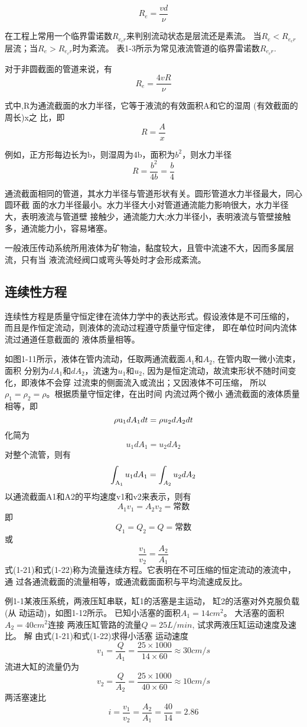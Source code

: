 
$$ R_{e}=\frac{vd}{\nu } $$

在工程上常用一个临界雷诺数$R_{e_cr}$来判别流动状态是层流还是素流。
当$R_{e}<R_{e_cr}$ 层流；当$R_{e} > R_{e_cr}$时为紊流。
表1-3所示为常见液流管道的临界雷诺数$R_{e_cr}$.


对于非圆截面的管道来说，有
$$R_{e}=\frac{4vR}{\nu }$$

式中,R为通流截面的水力半径，它等于液流的有效面积A和它的湿周
(有效截面的周长)x之
比，即
$$R=\frac{A}{x}$$

例如，正方形每边长为b，则湿周为4b，面积为$b^2$，则水力半径
$$R=\frac{b^2}{4b}=\frac{b}{4}$$

通流截面相同的管道，其水力半径与管道形状有关。圆形管道水力半径最大，同心圆环截 面的水力半径最小。水力半径大小对管道通流能力影响很大，水力半径大，表明液流与管道壁 接触少，通流能力大;水力半径小，表明液流与管壁接触多，通流能力小，容易堵塞。

一般液压传动系统所用液体为矿物油，黏度较大，且管中流速不大，因而多属层流，只有当 液流流经阀口或弯头等处时才会形成紊流。

\subsection{连续性方程}

连续性方程是质量守恒定律在流体力学中的表达形式。假设液体是不可压缩的，
而且是作恒定流动，则液体的流动过程遵守质量守恒定律，
即在单位时间内流体流过通道任意截面的 液体质量相等。

如图1-11所示，液体在管内流动，任取两通流截面$A_1$和$A_2$,
在管内取一微小流束，面积 分别为$dA_1$和$dA_2$，流速为$u_1$和$u_2$,
因为是恒定流动，故流束形状不随时间变化，即液体不会穿 
过流束的侧面流入或流出；又因液体不可压缩，
所以$\rho_1=\rho_2=\rho$。根据质量守恒定律，在出时间 内流过两个微小
通流截面的液体质量相等，即
\[\rho {{\rm{u}}_1}d{A_1}dt = \rho {u_2}d{A_2}dt\]
化简为
\[{u_1}d{A_1} = {u_2}d{A_2}\]
对整个流管，则有
\[\int_{{{\rm{A}}_1}} {{u_1}d{A_1}}  = \int_{{A_2}} {{u_2}d{A_2}} \]
以通流截面A1和A2的平均速度v1和v2来表示，则有
$${A_1}{v_1} = {A_2}{v_2} =\text{常数}$$ 
即
$${Q_1} = {Q_2} = Q =\text{常数}$$ 
或
\[\frac{{{v_1}}}{{{v_2}}} = \frac{{{A_2}}}{{{A_1}}}\]
式(1-21)和式(1-22)称为流量连续方程。它表明在不可压缩的恒定流动的液流中，通 过各通流截面的流量相等，或通流截面面积与平均流速成反比。

例1-1某液压系统，两液压缸串联，缸1的活塞是主运动，
缸2的活塞对外克服负载(从 动运动)，如图1-12所示。
已知小活塞的面积$A_1=14 cm^2 $。
大活塞的面积$A_2=40 cm^2 $连接 
两液压缸管路的流量$Q = 25 L/min$,
试求两液压缸运动速度及速比。
解	由式(1-21)和式(1-22)求得小活塞
运动速度
\[{v_1} = \frac{Q}{{{A_1}}} = \frac{{25 \times 1000}}{{14 \times 60}} \approx 30cm/s\]
流进大缸的流量仍为
\[{v_2} = \frac{Q}{{{A_2}}} = \frac{{25 \times 1000}}{{40 \times 60}} \approx 10cm/s\]
两活塞速比
\[i = \frac{{{v_1}}}{{{v_2}}} = \frac{{{A_2}}}{{{A_1}}} = \frac{{40}}{{14}} = 2.86\]
